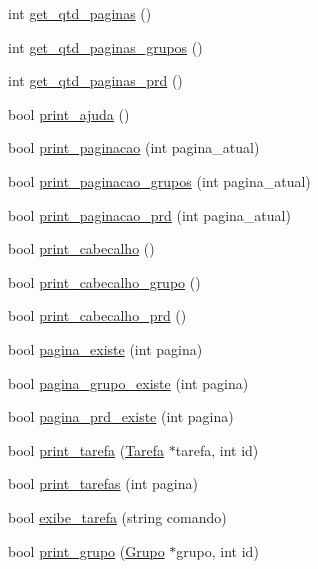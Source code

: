 \begin{DoxyCompactItemize}
\item 
int \hyperlink{classTerminal_a32ee131eb01ec417804965d183699f78}{get\+\_\+qtd\+\_\+paginas} ()
\item 
int \hyperlink{classTerminal_a4e72c12f3a0e6e3028cd0a87253966ca}{get\+\_\+qtd\+\_\+paginas\+\_\+grupos} ()
\item 
int \hyperlink{classTerminal_a0ebaf26f7d680bcd1412c3c692c3b7b2}{get\+\_\+qtd\+\_\+paginas\+\_\+prd} ()
\item 
bool \hyperlink{classTerminal_ad61f4e49e2c7aad146ae193920c8e2e8}{print\+\_\+ajuda} ()
\item 
bool \hyperlink{classTerminal_a4b1699a246eedcad0762c074c27ed3dc}{print\+\_\+paginacao} (int pagina\+\_\+atual)
\item 
bool \hyperlink{classTerminal_a33b9112ee605314c941413afd3d045fc}{print\+\_\+paginacao\+\_\+grupos} (int pagina\+\_\+atual)
\item 
bool \hyperlink{classTerminal_af7c7bbdbe5c28a4e797a42b4247ff121}{print\+\_\+paginacao\+\_\+prd} (int pagina\+\_\+atual)
\item 
bool \hyperlink{classTerminal_ab077ac695729b722e0c0e07f8508aa55}{print\+\_\+cabecalho} ()
\item 
bool \hyperlink{classTerminal_ae90c7487c329e9210234456f4e2723d9}{print\+\_\+cabecalho\+\_\+grupo} ()
\item 
bool \hyperlink{classTerminal_aeb95c3c6aa25ee2fa7898ed144ab47b5}{print\+\_\+cabecalho\+\_\+prd} ()
\item 
bool \hyperlink{classTerminal_a661628dafc3f0227f4acb58c32c5090c}{pagina\+\_\+existe} (int pagina)
\item 
bool \hyperlink{classTerminal_af95bd1d7646ccffb64be117d5d16d4e5}{pagina\+\_\+grupo\+\_\+existe} (int pagina)
\item 
bool \hyperlink{classTerminal_a6ff33aa1b1b2a2120542cac16f81c4b5}{pagina\+\_\+prd\+\_\+existe} (int pagina)
\item 
bool \hyperlink{classTerminal_a3633af9ee180a1a129f9c33c1a3aa3b9}{print\+\_\+tarefa} (\hyperlink{classTarefa}{Tarefa} $\ast$tarefa, int id)
\item 
bool \hyperlink{classTerminal_a99b5e852d3339543af8d740422c0f58b}{print\+\_\+tarefas} (int pagina)
\item 
bool \hyperlink{classTerminal_af2b2089477ced07e4acf9e8acafcd2f4}{exibe\+\_\+tarefa} (string comando)
\item 
bool \hyperlink{classTerminal_ae0951f8966234d5ec902112368a7c4a8}{print\+\_\+grupo} (\hyperlink{classGrupo}{Grupo} $\ast$grupo, int id)

\end{DoxyCompactItemize}
